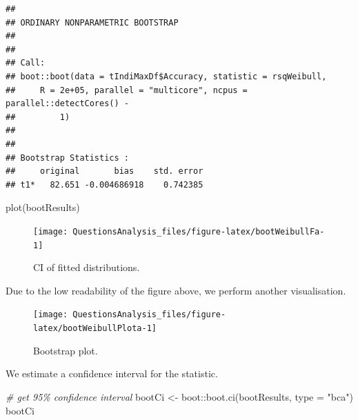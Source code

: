 \documentclass[
]{article}
\newenvironment{Shaded}{\begin{snugshade}}{\end{snugshade}}
\newcommand{\AttributeTok}[1]{\textcolor[rgb]{0.77,0.63,0.00}{#1}}
\newcommand{\CommentTok}[1]{\textcolor[rgb]{0.56,0.35,0.01}{\textit{#1}}}
\newcommand{\FunctionTok}[1]{\textcolor[rgb]{0.00,0.00,0.00}{#1}}
\newcommand{\NormalTok}[1]{#1}
\newcommand{\OtherTok}[1]{\textcolor[rgb]{0.56,0.35,0.01}{#1}}
\newcommand{\SpecialCharTok}[1]{\textcolor[rgb]{0.00,0.00,0.00}{#1}}
\newcommand{\StringTok}[1]{\textcolor[rgb]{0.31,0.60,0.02}{#1}}
\begin{document}
\begin{verbatim}
## 
## ORDINARY NONPARAMETRIC BOOTSTRAP
## 
## 
## Call:
## boot::boot(data = tIndiMaxDf$Accuracy, statistic = rsqWeibull, 
##     R = 2e+05, parallel = "multicore", ncpus = parallel::detectCores() - 
##         1)
## 
## 
## Bootstrap Statistics :
##     original       bias    std. error
## t1*   82.651 -0.004686918    0.742385
\end{verbatim}

\begin{Shaded}
\begin{Highlighting}[]
\FunctionTok{plot}\NormalTok{(bootResults)}
\end{Highlighting}
\end{Shaded}

\begin{figure}

{\centering \texttt{[image: QuestionsAnalysis\_files/figure-latex/bootWeibullFa-1]} 

}

\caption{CI of fitted distributions.}\label{fig:bootWeibullFa}
\end{figure}

Due to the low readability of the figure above, we perform another visualisation.

\begin{Shaded}
\end{Shaded}

\begin{figure}

{\centering \texttt{[image: QuestionsAnalysis\_files/figure-latex/bootWeibullPlota-1]} 

}

\caption{Bootstrap plot.}\label{fig:bootWeibullPlota}
\end{figure}

We estimate a confidence interval for the statistic.

\begin{Shaded}
\begin{Highlighting}[]
\CommentTok{\# get 95\% confidence interval}
\NormalTok{bootCi }\OtherTok{\textless{}{-}}\NormalTok{ boot}\SpecialCharTok{::}\FunctionTok{boot.ci}\NormalTok{(bootResults, }\AttributeTok{type =} \StringTok{"bca"}\NormalTok{)}
\NormalTok{bootCi}
\end{Highlighting}
\end{Shaded}
\end{document}
